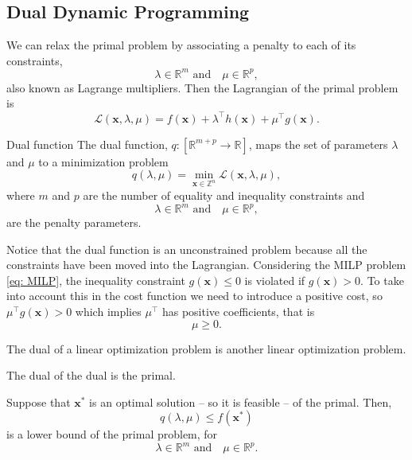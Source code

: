 \subsection{Dual Dynamic Programming}
We can relax the primal problem by associating a penalty to each of its constraints,
\begin{equation}
    \lambda\in\mathbb{R}^{m}\,\, \text{and} \quad \mu\in\mathbb{R}^{p},
\end{equation}
also known as Lagrange multipliers. Then the Lagrangian of the primal problem is
\begin{equation}
    \mathcal{L}(\mathbf{x}, \lambda, \mu) = f(\mathbf{x}) + \lambda^{\intercal}h(\mathbf{x}) + \mu^{\intercal}g(\mathbf{x}).
\end{equation}
\begin{definition}{Dual function}{}
The dual function, $q: \left[\mathbb{R}^{m+p}\rightarrow\mathbb{R}\right]$, maps the set of parameters $\lambda$ and $\mu$ to a minimization problem
\begin{equation}
    q(\lambda, \mu) = \min_{\mathbf{x}\in\mathbb{Z}^{n}}\mathcal{L}(\mathbf{x}, \lambda, \mu),
\end{equation}
where $m$ and $p$ are the number of equality and inequality constraints and
\begin{equation}
    \lambda\in\mathbb{R}^{m}\,\, \text{and} \quad \mu\in\mathbb{R}^{p},
\end{equation}
are the penalty parameters.
\end{definition}
Notice that the dual function is an unconstrained problem because all the constraints have been moved into the Lagrangian.
Considering the MILP problem \eqref{eq: MILP}, the inequality constraint $g(\mathbf{x})\leq 0$ is violated if $g(\mathbf{x})>0$. To take into account this in the cost function we need to introduce a positive cost, so $\mu^{\intercal}g(\mathbf{x})>0$ which implies $\mu^{\intercal}$ has positive coefficients, that is
\begin{equation}
    \mu \geq 0.
\end{equation}
\begin{theorem}{}{}
The dual of a linear optimization problem is another linear optimization problem.
\end{theorem}
\begin{theorem}{}{}
The dual of the dual is the primal.
\end{theorem}
\begin{theorem}{}{}
Suppose that $\mathbf{x}^{*}$ is an optimal solution -- so it is feasible -- of the primal. Then,
\begin{equation}
    q(\lambda, \mu) \leq f(\mathbf{x}^{*})
\end{equation}
is a lower bound of the primal problem, for
\begin{equation}
    \lambda\in\mathbb{R}^{m}\,\, \text{and} \quad \mu\in\mathbb{R}^{p}.
\end{equation}
\end{theorem}
